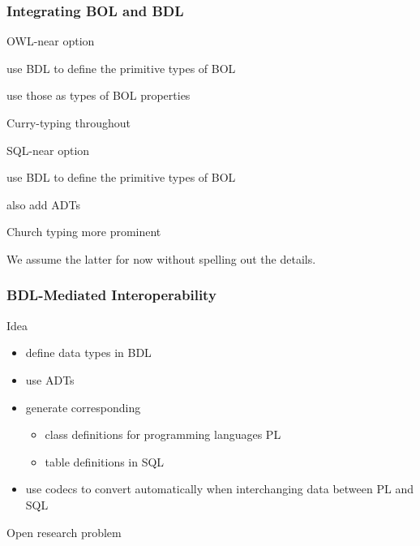 \begin{frame}\frametitle{Integrating BOL and BDL}
\begin{blockitems}{OWL-near option}
\item use BDL to define the primitive types of BOL
\item use those as types of BOL properties
\item Curry-typing throughout
\end{blockitems}

\begin{blockitems}{SQL-near option}
\item use BDL to define the primitive types of BOL
\item also add ADTs
\item Church typing more prominent
\end{blockitems}

We assume the latter for now without spelling out the details.
\end{frame}

\begin{frame}\frametitle{BDL-Mediated Interoperability}
Idea
 \begin{itemize}
 \item define data types in BDL 
 \item use ADTs
 \item generate corresponding
  \begin{itemize}
  \item class definitions for programming languages PL
  \item table definitions in SQL
  \end{itemize}
 \item use codecs to convert automatically when interchanging data between PL and SQL
 \end{itemize}

Open research problem
\end{frame}

